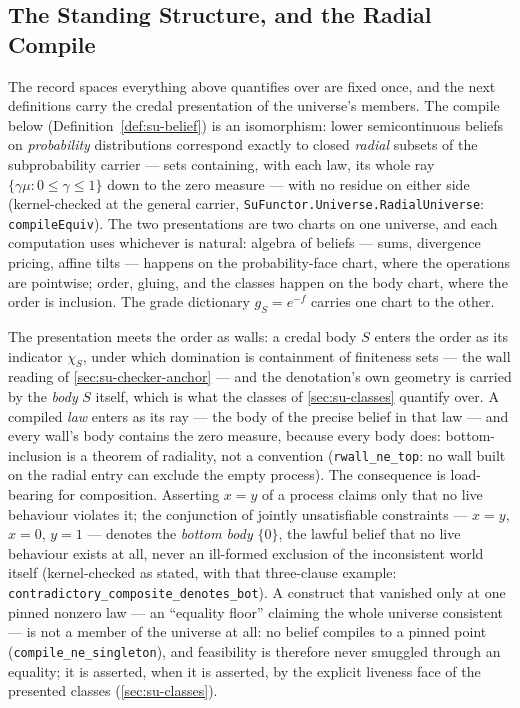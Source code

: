 \subsection{The Standing Structure, and the Radial Compile}

The record spaces everything above quantifies over are fixed once, and the
next definitions carry the credal presentation of the universe's members. The
compile below (Definition~\ref{def:su-belief}) is an isomorphism: lower
semicontinuous beliefs on \emph{probability} distributions correspond
exactly to closed \emph{radial} subsets of the subprobability carrier ---
sets containing, with each law, its whole ray $\{\gamma\mu : 0 \le \gamma \le
1\}$ down to the zero measure --- with no residue on either side
(kernel-checked at the general carrier,
\texttt{SuFunctor.Universe.RadialUniverse}: \texttt{compileEquiv}). The two
presentations are two charts on one universe, and each computation uses
whichever is natural: algebra of beliefs --- sums, divergence pricing,
affine tilts --- happens on the probability-face chart, where the operations
are pointwise; order, gluing, and the classes happen on the body chart, where
the order is inclusion. The grade dictionary $g_{S} = e^{-f}$ carries one
chart to the other.

The presentation meets the order as walls: a credal body $S$ enters the order
as its indicator $\chi_S$, under which domination is containment of
finiteness sets --- the wall reading of \autoref{sec:su-checker-anchor} ---
and the denotation's own geometry is carried by the \emph{body} $S$ itself,
which is what the classes of \autoref{sec:su-classes} quantify over. A
compiled \emph{law} enters as its ray --- the body of the precise belief in
that law --- and every wall's body contains the zero measure, because every
body does: bottom-inclusion is a theorem of radiality, not a convention
(\texttt{rwall\_ne\_top}: no wall built on the radial entry can exclude the
empty process). The consequence is load-bearing for composition. Asserting
$x = y$ of a process claims only that no live behaviour violates it; the
conjunction of jointly unsatisfiable constraints --- $x = y$, $x = 0$,
$y = 1$ --- denotes the \emph{bottom body} $\{0\}$, the lawful belief that no
live behaviour exists at all, never an ill-formed exclusion of the
inconsistent world itself (kernel-checked as stated, with that three-clause
example: \texttt{contradictory\_composite\_denotes\_bot}). A construct that
vanished only at one pinned nonzero law --- an ``equality floor'' claiming
the whole universe consistent --- is not a member of the universe at all: no
belief compiles to a pinned point (\texttt{compile\_ne\_singleton}), and
feasibility is therefore never smuggled through an equality; it is asserted,
when it is asserted, by the explicit liveness face of the presented classes
(\autoref{sec:su-classes}).

